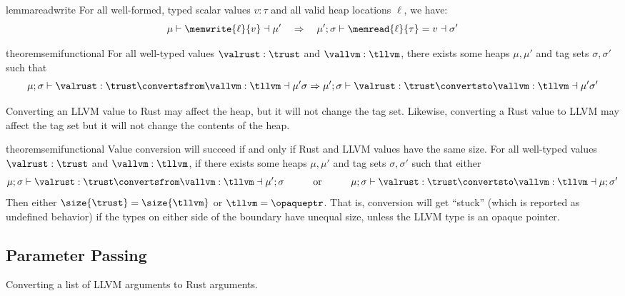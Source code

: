 \begin{restatable}{lemma}{readwrite}
\label{lemma:readwrite}
For all well-formed, typed scalar values $v:\tau$ and all valid heap locations $\ell$, we have:
$$\mu \vdash \memwrite{\ell}{v} \dashv \mu' \quad \Rightarrow \quad \mu';\sigma \vdash \memread{\ell}{\tau} = v\dashv \sigma'$$
\end{restatable} 


\begin{restatable}{theorem}{semifunctional}
\label{thm:bidirectionality}
For all well-typed values ${\valrust:\trust}$ and ${\vallvm:\tllvm}$, there exists some heaps $\mu, \mu'$ and tag sets $\sigma, \sigma'$ such that
$${\mu;\sigma \vdash \valrust :\trust \convertsfrom \vallvm:\tllvm \dashv \mu'\sigma} \Rightarrow 
{\mu';\sigma \vdash \valrust :\trust \convertsto \vallvm:\tllvm \dashv \mu'\sigma'}$$
\end{restatable}
Converting an LLVM value to Rust may affect the heap, but it will not change the tag set. Likewise, converting a Rust value to LLVM may affect the tag set but it will not change the contents of the heap.


\begin{restatable}{theorem}{semifunctional}
\label{thm:size}
Value conversion will succeed if and only if Rust and LLVM values have the same size.
For all well-typed values ${\valrust:\trust}$ and ${\vallvm:\tllvm}$, if there exists some heaps $\mu, \mu'$ and tag sets $\sigma, \sigma'$ such that either
$${\mu;\sigma \vdash \valrust :\trust \convertsfrom \vallvm:\tllvm \dashv \mu';\sigma} \quad\quad\quad \text{or} \quad\quad\quad
{\mu;\sigma \vdash \valrust :\trust \convertsto \vallvm:\tllvm \dashv \mu;\sigma'}$$
Then either $\size{\trust} = \size{\tllvm}$ or $\tllvm = \opaqueptr$. That is, conversion will get ``stuck'' (which is reported as undefined behavior) if the types on either side of the boundary have unequal size, unless the LLVM type is an opaque pointer.
\end{restatable}


\subsection{Parameter Passing}
\begin{algorithm}[H]
\small
\caption{Converting a list of LLVM arguments to Rust arguments.}
\label{alg:to_rust}

\end{algorithm}